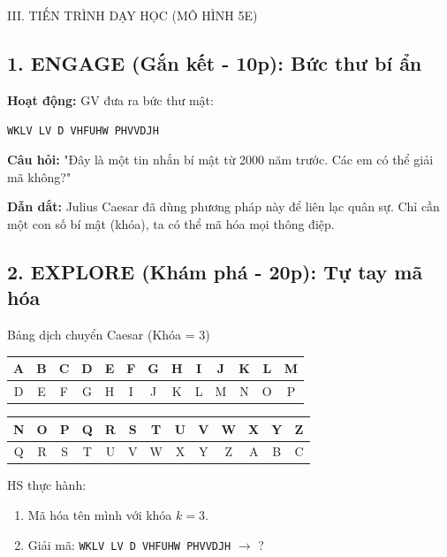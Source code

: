 \documentclass[12pt,a4paper]{article}
\begin{document}
\begin{sectionbox}{III. TIẾN TRÌNH DẠY HỌC (MÔ HÌNH 5E)}

\subsection*{1. ENGAGE (Gắn kết - 10p): Bức thư bí ẩn}
\textbf{Hoạt động:} GV đưa ra bức thư mật:
\begin{center}
\texttt{WKLV LV D VHFUHW PHVVDJH}
\end{center}
\textbf{Câu hỏi:} "Đây là một tin nhắn bí mật từ 2000 năm trước. Các em có thể giải mã không?"

\textbf{Dẫn dắt:} Julius Caesar đã dùng phương pháp này để liên lạc quân sự. Chỉ cần một con số bí mật (khóa), ta có thể mã hóa mọi thông điệp.

\subsection*{2. EXPLORE (Khám phá - 20p): Tự tay mã hóa}
\begin{activitybox}{Bảng dịch chuyển Caesar (Khóa = 3)}
\begin{center}
\begin{tabular}{|c|c|c|c|c|c|c|c|c|c|c|c|c|}
\hline
A & B & C & D & E & F & G & H & I & J & K & L & M \\
\hline
D & E & F & G & H & I & J & K & L & M & N & O & P \\
\hline
\end{tabular}
\vspace{0.3cm}

\begin{tabular}{|c|c|c|c|c|c|c|c|c|c|c|c|c|}
\hline
N & O & P & Q & R & S & T & U & V & W & X & Y & Z \\
\hline
Q & R & S & T & U & V & W & X & Y & Z & A & B & C \\
\hline
\end{tabular}
\end{center}
HS thực hành:
\begin{enumerate}
    \item Mã hóa tên mình với khóa $k=3$.
    \item Giải mã: \texttt{WKLV LV D VHFUHW PHVVDJH} $\to$ ?
\end{enumerate}
\end{activitybox}


\end{sectionbox}
\end{document}
